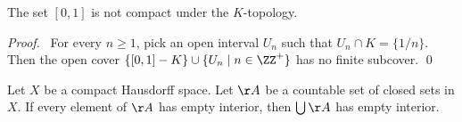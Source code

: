 \begin{example}
    \label{example:zero_one_not_compact}
    The set $[0,1]$ is not compact under the $K$-topology.
\end{example}

\begin{proof}
    \pf\ For every $n \geq 1$, pick an open interval $U_n$ such that $U_n \cap K = \{ 1/n \}$.
    Then the open cover $\{ [0,1]-K \} \cup \{ U_n \mid n \in \ZZ^+ \}$ has no finite subcover. \qed
\end{proof}

\begin{proposition}[AC]
    \label{proposition:pre_Baire_category}
    Let $X$ be a compact Hausdorff space. Let $\AA$ be a countable set of closed sets in $X$.
    If every element of $\AA$ has empty interior, then $\bigcup \AA$ has empty interior.
\end{proposition}

